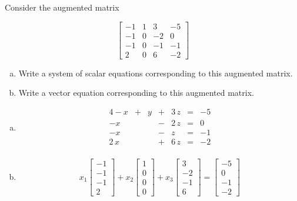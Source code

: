 
\begin{exerciseStatement}


 Consider the augmented matrix 

\[ \left[\begin{array}{ccc|c}
-1 & 1 & 3 & -5 \\
-1 & 0 & -2 & 0 \\
-1 & 0 & -1 & -1 \\
2 & 0 & 6 & -2
\end{array}\right] \]
\begin{enumerate}[(a)]
\item  Write a system of scalar equations corresponding to this augmented matrix. 
\item  Write a vector equation corresponding to this augmented matrix. 
\end{enumerate}
    
\end{exerciseStatement}
    
\begin{exerciseAnswer} 

\begin{enumerate}[(a)]
\item 
\begin{alignat*}{4} -x &+& y &+& 3 \, z &=& -5 \\-x & &  &-& 2 \, z &=& 0 \\-x & &  &-& z &=& -1 \\2 \, x & &  &+& 6 \, z &=& -2 \\ \end{alignat*}
            
\item \[ x_{1} \left[\begin{array}{c}
-1 \\
-1 \\
-1 \\
2
\end{array}\right] + x_{2} \left[\begin{array}{c}
1 \\
0 \\
0 \\
0
\end{array}\right] + x_{3} \left[\begin{array}{c}
3 \\
-2 \\
-1 \\
6
\end{array}\right] = \left[\begin{array}{c}
-5 \\
0 \\
-1 \\
-2
\end{array}\right] \]
\end{enumerate}
    
\end{exerciseAnswer}
    
